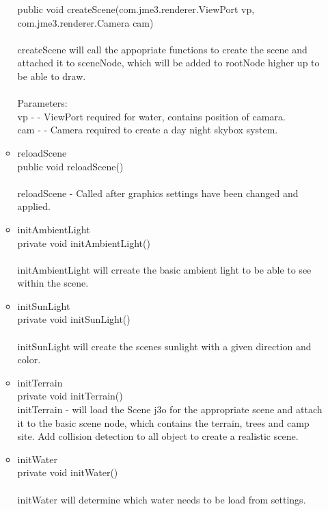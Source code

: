 \documentclass[letterpaper]{article}
\begin{document}
\begin{itemize}
\begin{itemize}
															public void createScene(com.jme3.renderer.ViewPort vp,
															               com.jme3.renderer.Camera cam) \\ \\
															createScene will call the appopriate functions to create the scene and attached it to sceneNode, which will be added to rootNode higher up to be able to draw. \\ \\
															Parameters: \\
															vp - - ViewPort required for water, contains position of camara. \\
															cam - - Camera required to create a day night skybox system. \\
													\item	reloadScene \\
															public void reloadScene() \\ \\
															reloadScene - Called after graphics settings have been changed and applied.
													\item	initAmbientLight \\
															private void initAmbientLight() \\ \\
															initAmbientLight will crreate the basic ambient light to be able to see within the scene. \\
													\item	initSunLight \\
															private void initSunLight() \\ \\
															initSunLight will create the scenes sunlight with a given direction and color.
													\item	initTerrain \\
															private void initTerrain() \\
															initTerrain - will load the Scene j3o for the appropriate scene and attach it to the basic scene node, which contains the terrain, trees and camp site. Add collision detection to all object to create a realistic scene. \\
													\item	initWater \\
															private void initWater() \\ \\
															initWater will determine which water needs to be load from settings.

\end{itemize}
\end{itemize}
\end{document}
